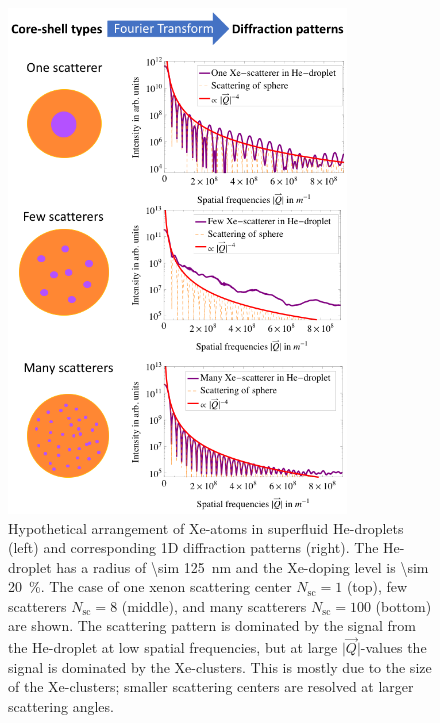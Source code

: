 \begin{figure}
 	\centering
 		\includegraphics[width=0.80\textwidth]{images/results/plum-pudding.png}
 	\caption[Hypothetical arrangement of Xe-clusters within He-droplets.]{Hypothetical arrangement of Xe-atoms in superfluid He-droplets (left) and corresponding 1D diffraction patterns (right). The He-droplet has a radius of \SI{\sim 125}{\nano\meter} and the Xe-doping level is \SI{\sim 20}{\percent}. The case of one xenon scattering center $N_{\text{sc}}=1$ (top), few scatterers $N_{\text{sc}}=8$ (middle), and many scatterers $N_{\text{sc}}=100$ (bottom) are shown. The scattering pattern is dominated by the signal from the He-droplet at low spatial frequencies, but at large $\lvert\vec{Q}\rvert$-values the signal is dominated by the Xe-clusters. This is mostly due to the size of the Xe-clusters; smaller scattering centers are resolved at larger scattering angles.}
 	\label{fig:HeXe-plum-pudding}
\end{figure}
